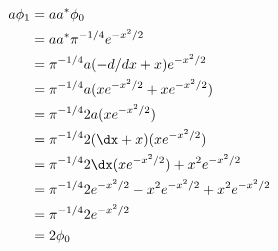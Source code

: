 \begin{align}
    a \phi_1 &= a a^* \phi_0 \\
    &= a a^* \pi^{-1/4} e^{-x^2 / 2} \\
    &= \pi^{-1/4} a (-d/dx + x) e^{-x^2 / 2} \\
    &= \pi^{-1/4} a ( xe^{-x^2 / 2} + xe^{-x^2 / 2} ) \\
    &= \pi^{-1/4} 2a ( xe^{-x^2 / 2} ) \\
    &= \pi^{-1/4} 2 (\dx + x) ( xe^{-x^2 / 2} ) \\
    &= \pi^{-1/4} 2 \dx ( xe^{-x^2 / 2} ) + x^2 e^{-x^2 / 2}  \\
    &= \pi^{-1/4} 2 e^{-x^2 / 2} - x^2e^{-x^2 / 2} + x^2 e^{-x^2 / 2}  \\
    &= \pi^{-1/4} 2 e^{-x^2 / 2} \\
    &= 2 \phi_0 \\
\end{align}
